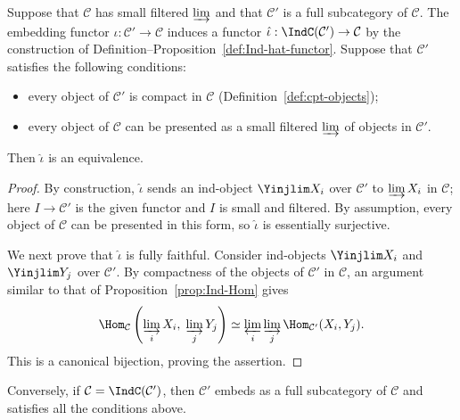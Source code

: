 \begin{proposition}\label{prop:recognition-Ind}
	Suppose that $\mathcal{C}$ has small filtered $\varinjlim$ and that $\mathcal{C}'$ is a full subcategory of $\mathcal{C}$. The embedding functor $\iota:\mathcal{C}'\to\mathcal{C}$ induces a functor $\hat{\iota}:\IndC(\mathcal{C}')\to\mathcal{C}$ by the construction of Definition--Proposition~\ref{def:Ind-hat-functor}. Suppose that $\mathcal{C}'$ satisfies the following conditions:
	\begin{itemize}
		\item every object of $\mathcal{C}'$ is compact in $\mathcal{C}$ (Definition~\ref{def:cpt-objects});
		\item every object of $\mathcal{C}$ can be presented as a small filtered $\varinjlim$ of objects in $\mathcal{C}'$.
	\end{itemize}
	Then $\hat{\iota}$ is an equivalence.
\end{proposition}
\begin{proof}
	By construction, $\hat{\iota}$ sends an ind-object $\Yinjlim X_i$ over $\mathcal{C}'$ to $\varinjlim X_i$ in $\mathcal{C}$; here $I\to\mathcal{C}'$ is the given functor and $I$ is small and filtered. By assumption, every object of $\mathcal{C}$ can be presented in this form, so $\hat{\iota}$ is essentially surjective.

	We next prove that $\hat{\iota}$ is fully faithful. Consider ind-objects $\Yinjlim X_i$ and $\Yinjlim Y_j$ over $\mathcal{C}'$. By compactness of the objects of $\mathcal{C}'$ in $\mathcal{C}$, an argument similar to that of Proposition~\ref{prop:Ind-Hom} gives
	\begin{gather*}
		\Hom_{\mathcal{C}}\left( \varinjlim_i X_i, \; \varinjlim_j Y_j\right) \simeq \varprojlim_i \varinjlim_j \Hom_{\mathcal{C}'}(X_i, Y_j).
	\end{gather*}
	This is a canonical bijection, proving the assertion.
\end{proof}

Conversely, if $\mathcal{C}=\IndC(\mathcal{C}')$, then $\mathcal{C}'$ embeds as a full subcategory of $\mathcal{C}$ and satisfies all the conditions above.
